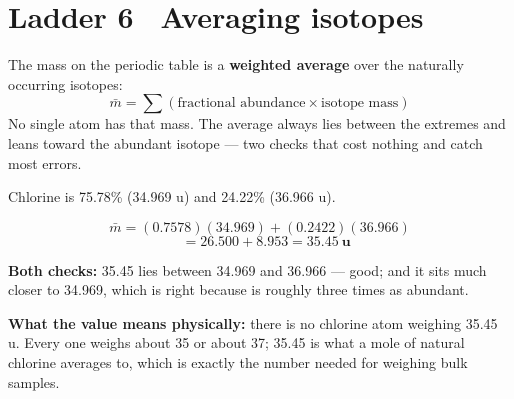 \documentclass{apchem-worksheet}
\begin{document}
\section*{\sffamily Ladder 6 \textbullet\ Averaging isotopes}

The mass on the periodic table is a \textbf{weighted average} over the
naturally occurring isotopes:
\[ \bar m = \sum(\text{fractional abundance} \times \text{isotope mass}) \]
No single atom has that mass. The average always lies between the
extremes and leans toward the abundant isotope --- two checks that cost
nothing and catch most errors.

\begin{workedexample}
Chlorine is 75.78\%  (34.969 u) and 24.22\% 
(36.966 u).

\[ \bar m = (0.7578)(34.969) + (0.2422)(36.966) \]
\[ \phantom{\bar m} = 26.500 + 8.953 = \mathbf{35.45~u} \]

\textbf{Both checks:} 35.45 lies between 34.969 and 36.966 --- good; and
it sits much closer to 34.969, which is right because  is
roughly three times as abundant.

\textbf{What the value means physically:} there is no chlorine atom
weighing 35.45 u. Every one weighs about 35 or about 37; 35.45 is what a
mole of natural chlorine averages to, which is exactly the number needed
for weighing bulk samples.
\end{workedexample}
\end{document}
